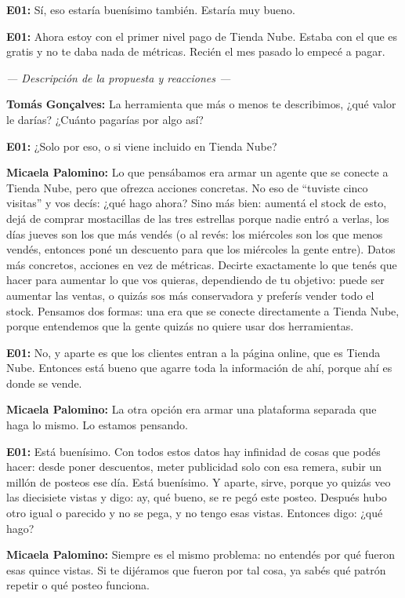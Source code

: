 \noindent\textbf{E01:} Sí, eso estaría buenísimo también. Estaría muy bueno.

\noindent\textbf{E01:} Ahora estoy con el primer nivel pago de Tienda Nube. Estaba con el que es gratis y no te daba nada de métricas. Recién el mes pasado lo empecé a pagar.

\noindent\textit{--- Descripción de la propuesta y reacciones ---}

\noindent\textbf{Tomás Gonçalves:} La herramienta que más o menos te describimos, ¿qué valor le darías? ¿Cuánto pagarías por algo así?

\noindent\textbf{E01:} ¿Solo por eso, o si viene incluido en Tienda Nube?

\noindent\textbf{Micaela Palomino:} Lo que pensábamos era armar un agente que se conecte a Tienda Nube, pero que ofrezca acciones concretas. No eso de ``tuviste cinco visitas'' y vos decís: ¿qué hago ahora? Sino más bien: aumentá el stock de esto, dejá de comprar mostacillas de las tres estrellas porque nadie entró a verlas, los días jueves son los que más vendés (o al revés: los miércoles son los que menos vendés, entonces poné un descuento para que los miércoles la gente entre). Datos más concretos, acciones en vez de métricas. Decirte exactamente lo que tenés que hacer para aumentar lo que vos quieras, dependiendo de tu objetivo: puede ser aumentar las ventas, o quizás sos más conservadora y preferís vender todo el stock. Pensamos dos formas: una era que se conecte directamente a Tienda Nube, porque entendemos que la gente quizás no quiere usar dos herramientas.

\noindent\textbf{E01:} No, y aparte es que los clientes entran a la página online, que es Tienda Nube. Entonces está bueno que agarre toda la información de ahí, porque ahí es donde se vende.

\noindent\textbf{Micaela Palomino:} La otra opción era armar una plataforma separada que haga lo mismo. Lo estamos pensando.

\noindent\textbf{E01:} Está buenísimo. Con todos estos datos hay infinidad de cosas que podés hacer: desde poner descuentos, meter publicidad solo con esa remera, subir un millón de posteos ese día. Está buenísimo. Y aparte, sirve, porque yo quizás veo las diecisiete vistas y digo: ay, qué bueno, se re pegó este posteo. Después hubo otro igual o parecido y no se pega, y no tengo esas vistas. Entonces digo: ¿qué hago?

\noindent\textbf{Micaela Palomino:} Siempre es el mismo problema: no entendés por qué fueron esas quince vistas. Si te dijéramos que fueron por tal cosa, ya sabés qué patrón repetir o qué posteo funciona.

